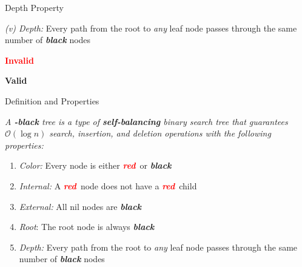 \documentclass[aspectratio=169]{beamer}
\newcommand{\textib}[1]{\textit{\textbf{{#1}}}}
\newcommand{\red}{\textib{\textcolor{red}{red}}}
\newcommand{\define}[1]{\begin{tcolorbox}[title={Definition}]\small{\textit{{#1}}}\end{tcolorbox}}
\begin{document}
\begin{frame}[fragile]{Depth Property}
    \vspace{-3em}

    \begin{minipage}[t][0.2\textheight][c]{\linewidth}
        \textit{(v) Depth:} Every path from the root to \textit{any} leaf node passes through the same number 
        of \textib{black} nodes
    \end{minipage}
    \vspace{-3em}

    \begin{minipage}[t][0.6\textheight][c]{\linewidth}
         {
            \depthone
        }
         {\depthtwo}
         {\textbf{\textcolor{red}{Invalid}}}
        \vspace{1.1em}

         {\depththree}
         {
            \vspace{-2em}
            \textbf{Valid}
        }
    \end{minipage}
\end{frame}



\begin{frame}[fragile]{Definition and Properties}
    \define{
        A \textib{\color{red}{red}}\textib{-black} tree is a type of \textib{self-balancing} binary 
        search tree that guarantees $\mathcal{O}(\log n)$ search, insertion, and deletion operations
        with the following properties:
    }
    \begin{enumerate}[label=\textit{(\roman*)}]
        \item \textit{Color:} Every node is either \red \ or \textib{black}
        \item \textit{Internal:} A \red \ node does not have a \red \ child
        \item \textit{External:} All nil nodes are \textib{black}
        \item \textit{Root}: The root node is always \textib{black}
        \item \textit{Depth:} Every path from the root to \textit{any} leaf node passes through
            the same number of \textib{black} nodes
    \end{enumerate}
\end{frame}
\end{document}
